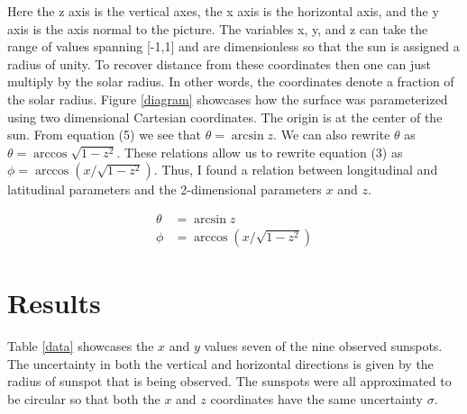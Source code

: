 \documentclass[aps,twocolumn,showpacs,preprintnumbers]{revtex4}
\begin{document}
Here the z axis is the vertical axes, the x axis is the horizontal axis, and the y axis is the axis normal to the picture. The variables x, y, and z can take the range of values spanning [-1,1] and are dimensionless so that the sun is assigned a radius of unity. To recover distance from these coordinates then one can just multiply by the solar radius. In other words, the coordinates denote a fraction of the solar radius. Figure \ref{diagram} showcases how the surface was parameterized using two dimensional Cartesian coordinates. The origin is at the center of the sun. From equation (5) we see that $\theta=\arcsin{z}$. We can also rewrite $\theta$ as $\theta = \arccos{\sqrt{1-z^2}}$. These relations allow us to rewrite equation (3) as $\phi = \arccos{(x/\sqrt{1-z^2})}$. Thus, I found a relation between longitudinal and latitudinal parameters and the 2-dimensional parameters $x$ and $z$.

\begin{align}
    \theta &= \arcsin{z}\\
    \phi &= \arccos{(x/\sqrt{1-z^2})}
\end{align}

\section{Results}

Table \ref{data} showcases the $x$ and $y$ values seven of the nine observed sunspots. The uncertainty in both the vertical and horizontal directions is given by the radius of sunspot that is being observed. The sunspots were all approximated to be circular so that both the $x$ and $z$ coordinates have the same uncertainty $\sigma$. 
\end{document}
